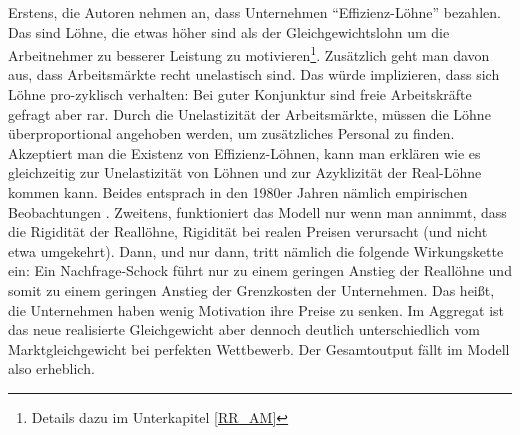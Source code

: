 Erstens, die Autoren nehmen an, dass Unternehmen "`Effizienz-Löhne"' bezahlen. Das sind Löhne, die etwas höher sind als der Gleichgewichtslohn um die Arbeitnehmer zu besserer Leistung zu motivieren\footnote{Details dazu im Unterkapitel \ref{RR_AM}}. Zusätzlich geht man davon aus, dass Arbeitsmärkte recht unelastisch sind. Das würde implizieren, dass sich Löhne pro-zyklisch verhalten: Bei guter Konjunktur sind freie Arbeitskräfte gefragt aber rar. Durch die Unelastizität der Arbeitsmärkte, müssen die Löhne überproportional angehoben werden, um zusätzliches Personal zu finden. Akzeptiert man die Existenz von Effizienz-Löhnen, kann man erklären wie es gleichzeitig zur Unelastizität von Löhnen und zur Azyklizität der Real-Löhne kommen kann. Beides entsprach in den 1980er Jahren nämlich empirischen Beobachtungen \parencite{RomerDavid1990}. 
Zweitens, funktioniert das Modell nur wenn man annimmt, dass die Rigidität der Reallöhne, Rigidität bei realen Preisen verursacht (und nicht etwa umgekehrt). Dann, und nur dann, tritt nämlich die folgende Wirkungskette ein: Ein Nachfrage-Schock führt nur zu einem geringen Anstieg der Reallöhne und somit zu einem geringen Anstieg der Grenzkosten der Unternehmen. Das heißt, die Unternehmen haben wenig Motivation ihre Preise zu senken. Im Aggregat ist das neue realisierte Gleichgewicht aber dennoch deutlich unterschiedlich vom Marktgleichgewicht bei perfekten Wettbewerb. Der Gesamtoutput fällt im Modell also erheblich. 

